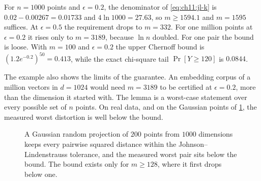 \begin{example}\label{ex:ch11:jl}
For $n=1000$ points and $\epsilon=0.2$, the denominator of \cref{eq:ch11:jl-k} is $0.02-0.00267=0.01733$ and $4\ln1000=27.63$, so $m\ge1594.1$ and $m=1595$ suffices. At $\epsilon=0.5$ the requirement drops to $m=332$. For one million points at $\epsilon=0.2$ it rises only to $m=3189$, because $\ln n$ doubled. For one pair the bound is loose. With $m=100$ and $\epsilon=0.2$ the upper Chernoff bound is $(1.2e^{-0.2})^{50}=0.413$, while the exact chi-square tail $\Pr[Y\ge120]$ is $0.0844$.
\end{example}

The example also shows the limits of the guarantee. An embedding corpus of a million vectors in $d=1024$ would need $m=3189$ to be certified at $\epsilon=0.2$, more than the dimension it started with. The lemma is a worst-case statement over every possible set of $n$ points. On real data, and on the Gaussian points of \cref{fig:ch11:jl}, the measured worst distortion is well below the bound.

\begin{figure}[tbp]\centering
{}
\caption{A Gaussian random projection of $200$ points from $1000$ dimensions keeps every pairwise squared distance within the Johnson--Lindenstrauss tolerance, and the measured worst pair sits below the bound. The bound exists only for $m\ge128$, where it first drops below one.}
\label{fig:ch11:jl}
\end{figure}

